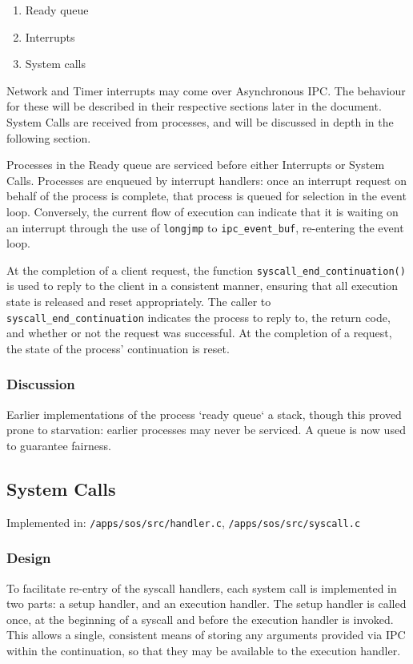 \documentclass[a4paper,12pt]{article}
\begin{document}
\begin{enumerate}
\item Ready queue
\item Interrupts
\item System calls
\end{enumerate}

Network and Timer interrupts may come over Asynchronous IPC.  The behaviour
for these will be described in their respective sections later in the
document.  System Calls are received from processes, and will be discussed in
depth in the following section.

Processes in the Ready queue are serviced before either Interrupts or System
Calls.  Processes are enqueued by interrupt handlers: once an interrupt
request on behalf of the process is complete, that process is queued for
selection in the event loop.  Conversely, the current flow of execution can
indicate that it is waiting on an interrupt through the use of
\texttt{longjmp} to \texttt{ipc\_event\_buf}, re-entering the event loop.

At the completion of a client request, the function
\texttt{syscall\_end\_continuation()} is used to reply to the client in a
consistent manner, ensuring that all execution state is released and reset
appropriately.  The caller to \texttt{syscall\_end\_continuation} indicates
the process to reply to, the return code, and whether or not the request was
successful.  At the completion of a request, the state of the process'
continuation is reset.

\subsubsection{Discussion}
Earlier implementations of the process `ready queue` a stack, though this
proved prone to starvation: earlier processes may never be serviced.  A queue
is now used to guarantee fairness.

\subsection{System Calls}
Implemented in: \texttt{/apps/sos/src/handler.c}, \texttt{/apps/sos/src/syscall.c}

\subsubsection{Design}
To facilitate re-entry of the syscall handlers, each system call is
implemented in two parts: a setup handler, and an execution handler.  The
setup handler is called once, at the beginning of a syscall and before the
execution handler is invoked.  This allows a single, consistent means of
storing any arguments provided via IPC within the continuation, so that they
may be available to the execution handler.
\end{document}
